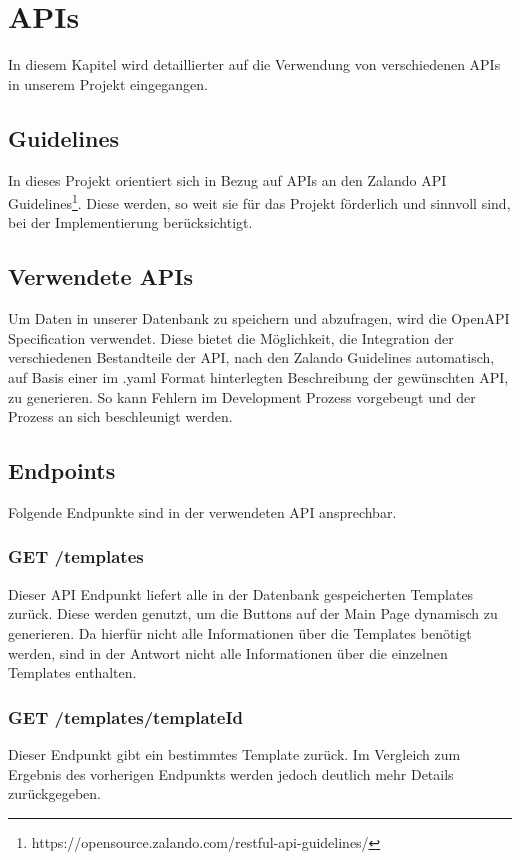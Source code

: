 \chapter{\ac{API}s}\label{ch:apis}
In diesem Kapitel wird detaillierter auf die Verwendung von verschiedenen \ac{API}s in unserem 
Projekt eingegangen.

\section{Guidelines}
In dieses Projekt orientiert sich in Bezug auf \ac{API}s an den Zalando API 
Guidelines\footnote{https://opensource.zalando.com/restful-api-guidelines/}.
Diese werden, so weit sie für das Projekt förderlich und sinnvoll sind, bei der Implementierung
berücksichtigt.

\section{Verwendete \ac{API}s}
Um Daten in unserer Datenbank zu speichern und abzufragen, wird die OpenAPI Specification
verwendet. Diese bietet die Möglichkeit, die Integration der verschiedenen Bestandteile der
\ac{API}, nach den Zalando Guidelines automatisch, auf Basis einer im .yaml Format hinterlegten
Beschreibung der gewünschten \ac{API}, zu generieren. So kann Fehlern im Development
Prozess vorgebeugt und der Prozess an sich beschleunigt werden.

\section{Endpoints}
Folgende Endpunkte sind in der verwendeten \ac{API} ansprechbar.

\subsection{GET /templates}

Dieser \ac{API} Endpunkt liefert alle in der Datenbank gespeicherten Templates zurück. Diese
werden genutzt, um die Buttons auf der Main Page dynamisch zu generieren. Da hierfür nicht
alle Informationen über die Templates benötigt werden, sind in der Antwort nicht alle
Informationen über die einzelnen Templates enthalten.

\subsection{GET /templates/{templateId}}
Dieser Endpunkt gibt ein bestimmtes Template zurück. Im Vergleich zum Ergebnis des vorherigen
Endpunkts werden jedoch deutlich mehr Details zurückgegeben.

